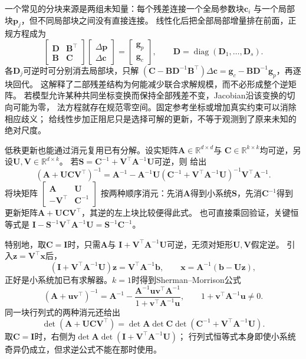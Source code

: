一个常见的分块来源是两组未知量：每个残差连接一个全局参数块$\bm c_i$
与一个局部块$\bm p_j$，但不同局部块之间没有直接连接。
线性化后把全部局部增量排在前面，正规方程成为
\[
 \begin{bmatrix}\bm D&\bm B^\top\\\bm B&\bm C\end{bmatrix}
 \begin{bmatrix}\Delta\bm p\\\Delta\bm c\end{bmatrix}
 =\begin{bmatrix}\bm g_p\\\bm g_c\end{bmatrix},
 \qquad \bm D=\operatorname{diag}(\bm D_1,\ldots,\bm D_s).
\]
各$\bm D_j$可逆时可分别消去局部块，只解
$(\bm C-\bm B\bm D^{-1}\bm B^\top)\Delta\bm c
=\bm g_c-\bm B\bm D^{-1}\bm g_p$，再逐块回代。
这解释了二部残差结构为何能减少联合求解规模，而不必形成整个逆矩阵。
若模型允许某种共同坐标变换而保持全部残差不变，Jacobian沿该变换的切向可能为零，
法方程就存在规范零空间。固定参考坐标或增加真实约束可以消除相应歧义；
给线性步加正阻尼只是选择可解的更新，不等于观测到了原来未知的绝对尺度。

低秩更新也能通过消元复用已有分解。设实矩阵$\bm A\in\mathbb R^{d\times d}$与
$\bm C\in\mathbb R^{k\times k}$均可逆，另设$\bm U,\bm V\in\mathbb R^{d\times k}$。
若$\bm S=\bm C^{-1}+\bm V^\top\bm A^{-1}\bm U$可逆，则
给出
\begin{equation}
 (\bm A+\bm U\bm C\bm V^\top)^{-1}
 =\bm A^{-1}-\bm A^{-1}\bm U
 (\bm C^{-1}+\bm V^\top\bm A^{-1}\bm U)^{-1}
 \bm V^\top\bm A^{-1}.
 \label{eq:matrix-analysis-woodbury}
\end{equation}
将块矩阵
$\left[\begin{smallmatrix}\bm A&\bm U\\-\bm V^\top&\bm C^{-1}\end{smallmatrix}\right]$
按两种顺序消元：先消$\bm A$得到小系统$\bm S$，先消$\bm C^{-1}$得到
更新矩阵$\bm A+\bm U\bm C\bm V^\top$，其逆的左上块比较便得此式。
也可直接乘回验证，关键恒等式是
$\bm I-\bm S^{-1}\bm V^\top\bm A^{-1}\bm U=\bm S^{-1}\bm C^{-1}$。

特别地，取$\bm C=\bm I$时，只需$\bm A$与
$\bm I+\bm V^\top\bm A^{-1}\bm U$可逆，无须对矩形$\bm U,\bm V$假定逆。
引入$\bm z=\bm V^\top\bm x$后，
\[
 (\bm I+\bm V^\top\bm A^{-1}\bm U)\bm z
 =\bm V^\top\bm A^{-1}\bm b,\qquad
 \bm x=\bm A^{-1}(\bm b-\bm U\bm z),
\]
正好是小系统加已有求解器。$k=1$时得到Sherman--Morrison公式
\[
 (\bm A+\bm u\bm v^\top)^{-1}
 =\bm A^{-1}
 -\frac{\bm A^{-1}\bm u\bm v^\top\bm A^{-1}}
        {1+\bm v^\top\bm A^{-1}\bm u},
 \qquad1+\bm v^\top\bm A^{-1}\bm u\neq0.
\]
同一块行列式的两种消元还给出
\[
 \det(\bm A+\bm U\bm C\bm V^\top)
 =\det\bm A\det\bm C
  \det(\bm C^{-1}+\bm V^\top\bm A^{-1}\bm U).
\]
取$\bm C=\bm I$时，右侧为$\det\bm A\det(\bm I+\bm V^\top\bm A^{-1}\bm U)$；
行列式恒等式本身即使小系统奇异仍成立，但求逆公式不能在那时使用。

